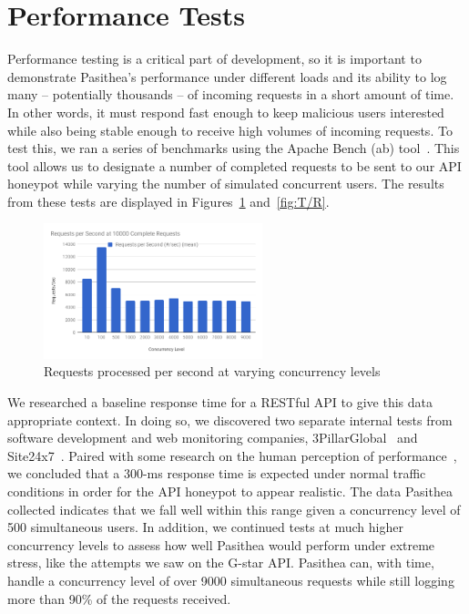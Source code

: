 
\section{Performance Tests} \label{performance}

Performance testing is a critical part of development, so it is important to demonstrate Pasithea's performance under different loads and its ability to log many -- potentially thousands -- of incoming requests in a short amount of time. 
In other words, it must respond fast enough to keep malicious users interested while also being stable enough to receive high volumes of incoming requests. 
To test this, we ran a series of benchmarks using the Apache Bench (ab) tool~\cite{ab}. 
This tool allows us to designate a number of completed requests to be sent to our API honeypot while varying the number of simulated concurrent users. 
The results from these tests are displayed in Figures~\ref{fig:R/s} and~\ref{fig:T/R}. 

\begin{figure}[b]
   \centering
   \includegraphics[width=2.5in]{images/RequestsperSecond.png} 
   \caption{Requests processed per second at varying concurrency levels}
   \label{fig:R/s}
\end{figure}

We researched a baseline response time for a RESTful API to give this data appropriate context. 
In doing so, we discovered two separate internal tests from software development and web monitoring companies, 3PillarGlobal~\cite{3Pillar} and Site24x7~\cite{site24x7}. 
Paired with some research on the human perception of performance~\cite{performance}, we concluded that a 300-ms response time is expected under normal traffic conditions in order for the API honeypot to appear realistic. 
The data Pasithea collected indicates that we fall well within this range given a concurrency level of 500 simultaneous users. 
In addition, we continued tests at much higher concurrency levels to assess how well Pasithea would perform under extreme stress, like the attempts we saw on the G-star API. 
Pasithea can, with time, handle a concurrency level of over 9000 simultaneous requests while still logging more than 90\% of the requests received.

